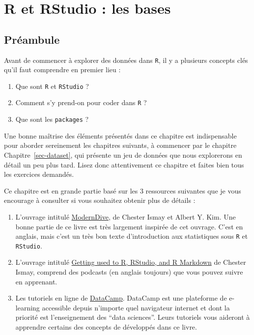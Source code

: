 \documentclass[
  a4paper,
  DIV=11,
  numbers=noendperiod,
  oneside]{scrreprt}
\providecommand{\tightlist}{%
  \setlength{\itemsep}{0pt}\setlength{\parskip}{0pt}}\usepackage{longtable,booktabs,array}
\begin{document}

\chapter{R et RStudio : les bases}\label{sec-basics}

\section{Préambule}\label{pruxe9ambule}

Avant de commencer à explorer des données dans \texttt{R}, il y a
plusieurs concepts clés qu'il faut comprendre en premier lieu :

\begin{enumerate}
\def\labelenumi{\arabic{enumi}.}
\tightlist
\item
  Que sont \texttt{R} et \texttt{RStudio} ?
\item
  Comment s'y prend-on pour coder dans \texttt{R} ?
\item
  Que sont les \texttt{packages} ?
\end{enumerate}

Une bonne maîtrise des éléments présentés dans ce chapitre est
indispensable pour aborder sereinement les chapitres suivants, à
commencer par le chapitre Chapitre~\ref{sec-dataset}, qui présente un
jeu de données que nous explorerons en détail un peu plus tard. Lisez
donc attentivement ce chapitre et faites bien tous les exercices
demandés.

Ce chapitre est en grande partie basé sur les 3 ressources suivantes que
je vous encourage à consulter si vous souhaitez obtenir plus de détails
:

\begin{enumerate}
\def\labelenumi{\arabic{enumi}.}
\tightlist
\item
  L'ouvrage intitulé
  \href{https://moderndive.com/index.html}{ModernDive}, de Chester Ismay
  et Albert Y. Kim. Une bonne partie de ce livre est très largement
  inspirée de cet ouvrage. C'est en anglais, mais c'est un très bon
  texte d'introduction aux statistiques sous \texttt{R} et
  \texttt{RStudio}.
\item
  L'ouvrage intitulé
  \href{https://ismayc.github.io/rbasics-book/}{Getting used to R,
  RStudio, and R Markdown} de Chester Ismay, comprend des podcasts (en
  anglais toujours) que vous pouvez suivre en apprenant.
\item
  Les tutoriels en ligne de \href{https://datacamp.com/}{DataCamp}.
  DataCamp est une plateforme de e-learning accessible depuis n'importe
  quel navigateur internet et dont la priorité est l'enseignement des
  ``data sciences''. Leurs tutoriels vous aideront à apprendre certains
  des concepts de développés dans ce livre.
\end{enumerate}
\end{document}
